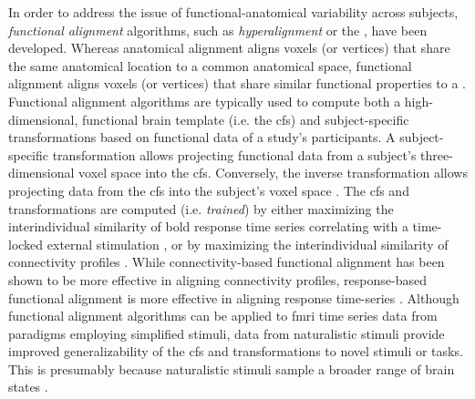 %
%
In order to address the issue of functional-anatomical variability across
subjects, \textit{functional alignment} algorithms, such as
\textit{hyperalignment} \citep{haxby2011common, guntupalli2016model} or the
 \citep{chen2015reduced, zhang2016searchlight}, have been developed.
%
Whereas anatomical alignment aligns voxels (or vertices) that share the same
anatomical location to a common anatomical space, functional alignment aligns
voxels (or vertices) that share similar functional properties to a .
%
Functional alignment algorithms are typically used to compute both a
high-dimensional, functional brain template (i.e. the \ac{cfs}) and
subject-specific transformations based on functional data of a study's
participants.
%
A subject-specific transformation allows projecting functional data from a
subject's three-dimensional voxel space into the \ac{cfs}.
%
Conversely, the inverse transformation allows projecting data from the \ac{cfs}
into the subject's voxel space \citep{haxby2020hyperalignment,
kumar2020brainiak}.
%
The \ac{cfs} and transformations are computed (i.e. \textit{trained}) by either
maximizing the interindividual similarity of \ac{bold} response time series
correlating with a time-locked external stimulation \citep{haxby2011common,
chen2015reduced, sabuncu2010function}, or by maximizing the interindividual
similarity of connectivity profiles \citep{feilong2018reliable,
guntupalli2018computational, nastase2019leveraging}.
%
While connectivity-based functional alignment has been shown to be more
effective in aligning connectivity profiles, response-based functional alignment
is more effective in aligning response time-series
\citep{guntupalli2018computational}.
%
Although functional alignment algorithms can be applied to \ac{fmri} time series
data from paradigms employing simplified stimuli, data from naturalistic stimuli
provide
%
improved generalizability of the \ac{cfs}
%
and transformations
%
to novel stimuli or tasks.
%
This is presumably because naturalistic stimuli sample a broader range of brain
states \citep{haxby2011common, guntupalli2016model}.

